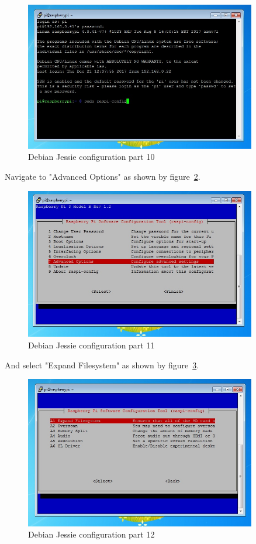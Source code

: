 \documentclass[12pt,]{article}
\begin{document}
\begin{figure}[H]
  	\begin{center}
    	\includegraphics[width=0.9\textwidth]{Ras_9}
  	\end{center}
  	\caption{Debian Jessie configuration part 10}
	\label{fig:27}
\end{figure}
Navigate to "Advanced Options" as shown by figure~\ref{fig:28}.
\begin{figure}[H]
  	\begin{center}
    	\includegraphics[width=0.9\textwidth]{Ras_10}
  	\end{center}
  	\caption{Debian Jessie configuration part 11}
	\label{fig:28}
\end{figure}
And select "Expand Filesystem" as shown by figure~\ref{fig:29}.
\begin{figure}[H]
  	\begin{center}
    	\includegraphics[width=0.9\textwidth]{Ras_11}
  	\end{center}
  	\caption{Debian Jessie configuration part 12}
	\label{fig:29}
\end{figure}
\end{document}
